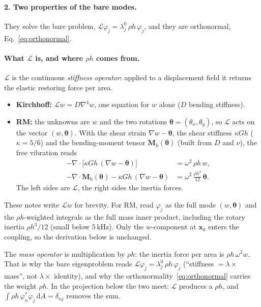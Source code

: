 \paragraph{2. Two properties of the bare modes.}
They solve the bare problem, $\mathcal{L}\varphi_j = \lambda_j^0\, \rho h\,
\varphi_j$, and they are orthonormal, Eq.~\eqref{eq:orthonormal}.

\paragraph{What $\mathcal{L}$ is, and where $\rho h$ comes from.}
$\mathcal{L}$ is the continuous \emph{stiffness operator}: applied to a
displacement field it returns the elastic restoring force per area.
\begin{itemize}
  \item \textbf{Kirchhoff:} $\mathcal{L}w = D\nabla^4 w$, one equation for $w$
        alone ($D$ bending stiffness).
  \item \textbf{RM:} the unknowns are $w$ and the two rotations
        $\boldsymbol{\theta} = (\theta_x, \theta_y)$, so $\mathcal{L}$ acts on the
        vector $(w, \boldsymbol{\theta})$. With the shear strain
        $\nabla w - \boldsymbol{\theta}$, the shear stiffness $\kappa G h$
        ($\kappa = 5/6$) and the bending-moment tensor
        $\mathbf{M}_\mathrm{b}(\boldsymbol{\theta})$ (built from $D$ and $\nu$),
        the free vibration reads
        \begin{align}
          -\nabla\cdot\bigl[\kappa G h\,(\nabla w - \boldsymbol{\theta})\bigr]
            &= \omega^2\, \rho h\, w , \\
          -\nabla\cdot\mathbf{M}_\mathrm{b}(\boldsymbol{\theta})
            - \kappa G h\,(\nabla w - \boldsymbol{\theta})
            &= \omega^2\, \frac{\rho h^3}{12}\, \boldsymbol{\theta} .
        \end{align}
        The left sides are $\mathcal{L}$, the right sides the inertia forces.
\end{itemize}
These notes write $\mathcal{L}w$ for brevity. For RM, read $\varphi_j$ as the
full mode $(w, \boldsymbol{\theta})$ and the $\rho h$-weighted integrals as the
full mass inner product, including the rotary inertia $\rho h^3/12$ (small
below $5\,\mathrm{kHz}$). Only the $w$-component at $\mathbf{x}_0$ enters the
coupling, so the derivation below is unchanged.

The \emph{mass operator} is multiplication by $\rho h$: the inertia force per
area is $\rho h\,\omega^2 w$. That is why the bare eigenproblem reads
$\mathcal{L}\varphi_j = \lambda_j^0\, \rho h\, \varphi_j$ (``stiffness $=
\lambda \times$ mass'', not $\lambda \times$ identity), and why the
orthonormality~\eqref{eq:orthonormal} carries the weight $\rho h$. In the
projection below the two meet: $\mathcal{L}$ produces a $\rho h$, and
$\int \rho h\, \varphi_n^* \varphi_j\,\mathrm{d}A = \delta_{nj}$ removes the sum.

